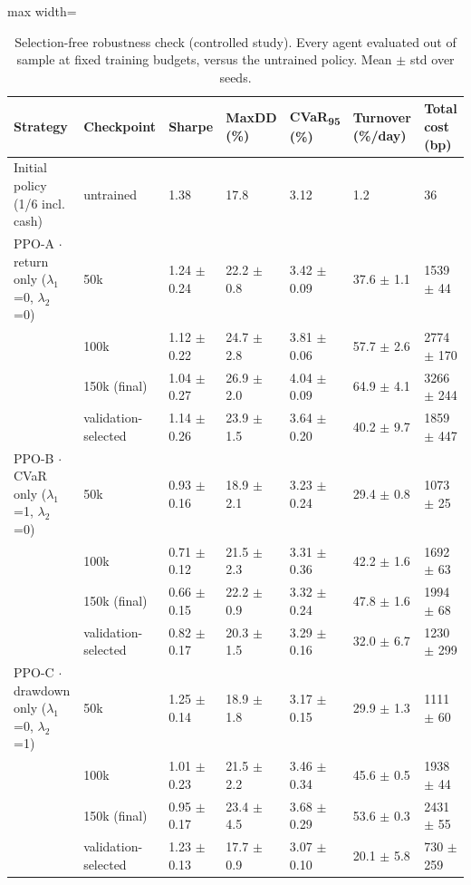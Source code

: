 \documentclass[11pt]{article}
\begin{document}
\begin{table}[!htbp]
\centering\scriptsize
\caption{Selection-free robustness check (controlled study). Every agent evaluated out of sample at fixed training budgets, versus the untrained policy. Mean $\pm$ std over seeds.\label{tab-checkpoints-syn}}
\begin{adjustbox}{max width=\linewidth}
\begin{tabular}{@{}lllllll@{}}
\toprule
Strategy & Checkpoint & Sharpe & MaxDD (\%) & CVaR\textsubscript{95} (\%) & Turnover (\%/day) & Total cost (bp) \\
\midrule
Initial policy (1/6 incl. cash) & untrained & 1.38 & 17.8 & 3.12 & 1.2 & 36 \\
PPO-A $\cdot$ return only {($\lambda_1$=0, $\lambda_2$=0)} & 50k & 1.24{ $\pm$ 0.24} & 22.2{ $\pm$ 0.8} & 3.42{ $\pm$ 0.09} & 37.6{ $\pm$ 1.1} & 1539{ $\pm$ 44} \\
& 100k & 1.12{ $\pm$ 0.22} & 24.7{ $\pm$ 2.8} & 3.81{ $\pm$ 0.06} & 57.7{ $\pm$ 2.6} & 2774{ $\pm$ 170} \\
& 150k (final) & 1.04{ $\pm$ 0.27} & 26.9{ $\pm$ 2.0} & 4.04{ $\pm$ 0.09} & 64.9{ $\pm$ 4.1} & 3266{ $\pm$ 244} \\
& validation-selected & 1.14{ $\pm$ 0.26} & 23.9{ $\pm$ 1.5} & 3.64{ $\pm$ 0.20} & 40.2{ $\pm$ 9.7} & 1859{ $\pm$ 447} \\
PPO-B $\cdot$ CVaR only {($\lambda_1$=1, $\lambda_2$=0)} & 50k & 0.93{ $\pm$ 0.16} & 18.9{ $\pm$ 2.1} & 3.23{ $\pm$ 0.24} & 29.4{ $\pm$ 0.8} & 1073{ $\pm$ 25} \\
& 100k & 0.71{ $\pm$ 0.12} & 21.5{ $\pm$ 2.3} & 3.31{ $\pm$ 0.36} & 42.2{ $\pm$ 1.6} & 1692{ $\pm$ 63} \\
& 150k (final) & 0.66{ $\pm$ 0.15} & 22.2{ $\pm$ 0.9} & 3.32{ $\pm$ 0.24} & 47.8{ $\pm$ 1.6} & 1994{ $\pm$ 68} \\
& validation-selected & 0.82{ $\pm$ 0.17} & 20.3{ $\pm$ 1.5} & 3.29{ $\pm$ 0.16} & 32.0{ $\pm$ 6.7} & 1230{ $\pm$ 299} \\
PPO-C $\cdot$ drawdown only {($\lambda_1$=0, $\lambda_2$=1)} & 50k & 1.25{ $\pm$ 0.14} & 18.9{ $\pm$ 1.8} & 3.17{ $\pm$ 0.15} & 29.9{ $\pm$ 1.3} & 1111{ $\pm$ 60} \\
& 100k & 1.01{ $\pm$ 0.23} & 21.5{ $\pm$ 2.2} & 3.46{ $\pm$ 0.34} & 45.6{ $\pm$ 0.5} & 1938{ $\pm$ 44} \\
& 150k (final) & 0.95{ $\pm$ 0.17} & 23.4{ $\pm$ 4.5} & 3.68{ $\pm$ 0.29} & 53.6{ $\pm$ 0.3} & 2431{ $\pm$ 55} \\
& validation-selected & 1.23{ $\pm$ 0.13} & 17.7{ $\pm$ 0.9} & 3.07{ $\pm$ 0.10} & 20.1{ $\pm$ 5.8} & 730{ $\pm$ 259} \\

\end{tabular}
\end{adjustbox}
\end{table}
\end{document}
